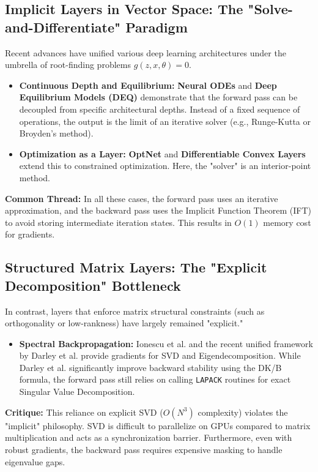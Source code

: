 \documentclass{article}
\begin{document}
\subsection{Implicit Layers in Vector Space: The "Solve-and-Differentiate" Paradigm}
Recent advances have unified various deep learning architectures under the umbrella of root-finding problems $g(z, x, \theta) = 0$.
\begin{itemize}
  \item \textbf{Continuous Depth and Equilibrium:} \textbf{Neural ODEs} \cite{chen2018neuralode} and \textbf{Deep Equilibrium Models (DEQ)} \cite{bai2019deq} demonstrate that the forward pass can be decoupled from specific architectural depths. Instead of a fixed sequence of operations, the output is the limit of an iterative solver (e.g., Runge-Kutta or Broyden's method).
  \item \textbf{Optimization as a Layer:} \textbf{OptNet} \cite{amos2017optnet} and \textbf{Differentiable Convex Layers} \cite{agrawal2019differentiable} extend this to constrained optimization. Here, the "solver" is an interior-point method.
\end{itemize}
\textbf{Common Thread:} In all these cases, the forward pass uses an iterative approximation, and the backward pass uses the Implicit Function Theorem (IFT) to avoid storing intermediate iteration states. This results in $O(1)$ memory cost for gradients.

\subsection{Structured Matrix Layers: The "Explicit Decomposition" Bottleneck}
In contrast, layers that enforce matrix structural constraints (such as orthogonality or low-rankness) have largely remained "explicit."
\begin{itemize}
  \item \textbf{Spectral Backpropagation:} Ionescu et al. \cite{ionescu2015matrix} and the recent unified framework by Darley et al. \cite{darley2024unified} provide gradients for SVD and Eigendecomposition. While Darley et al. significantly improve backward stability using the DK/B formula, the forward pass still relies on calling \texttt{LAPACK} routines for exact Singular Value Decomposition.
\end{itemize}
\textbf{Critique:} This reliance on explicit SVD ($O(N^3)$ complexity) violates the "implicit" philosophy. SVD is difficult to parallelize on GPUs compared to matrix multiplication and acts as a synchronization barrier. Furthermore, even with robust gradients, the backward pass requires expensive masking to handle eigenvalue gaps.
\end{document}
